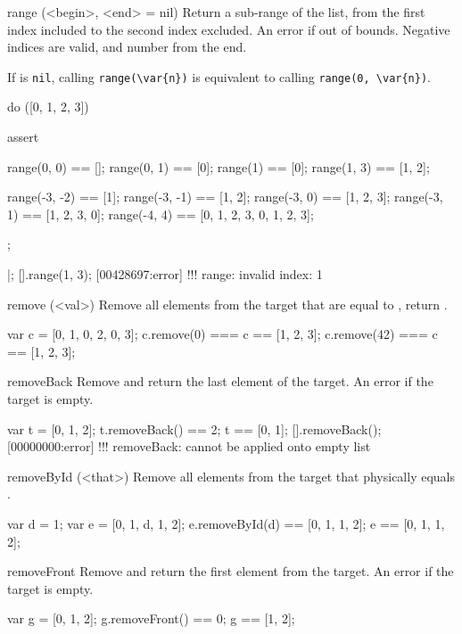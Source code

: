 \begin{urbiscriptapi}
\item[range](<begin>, <end> = nil)%
  Return a sub-range of the list, from the first index included to the
  second index excluded.  An error if out of bounds.  Negative indices
  are valid, and number from the end.

  If  is \lstinline|nil|, calling \lstinline|range(\var{n})|
  is equivalent to calling \lstinline|range(0, \var{n})|.

\begin{urbiscript}
do ([0, 1, 2, 3])
{
  assert
  {
    range(0, 0)   == [];
    range(0, 1)   == [0];
    range(1)      == [0];
    range(1, 3)   == [1, 2];

    range(-3, -2) == [1];
    range(-3, -1) == [1, 2];
    range(-3, 0)  == [1, 2, 3];
    range(-3, 1)  == [1, 2, 3, 0];
    range(-4, 4)  == [0, 1, 2, 3, 0, 1, 2, 3];
  };
}|;
[].range(1, 3);
[00428697:error] !!! range: invalid index: 1
\end{urbiscript}


\item[remove](<val>)%
  Remove all elements from the target that are equal to , return
  \this.

\begin{urbiassert}
var c = [0, 1, 0, 2, 0, 3];
c.remove(0)  === c ==  [1, 2, 3];
c.remove(42) === c ==  [1, 2, 3];
\end{urbiassert}


\item[removeBack]
  Remove and return the last element of the target. An error if the
  target is empty.

\begin{urbiassert}
var t = [0, 1, 2];
t.removeBack() == 2;
t == [0, 1];
[].removeBack();
[00000000:error] !!! removeBack: cannot be applied onto empty list
\end{urbiassert}


\item[removeById](<that>)%
  Remove all elements from the target that physically equals
  .

\begin{urbiassert}
var d = 1;
var e = [0, 1, d, 1, 2];
e.removeById(d) == [0, 1, 1, 2];
e == [0, 1, 1, 2];
\end{urbiassert}


\item[removeFront] Remove and return the first element from the target. An
  error if the target is empty.

\begin{urbiassert}
var g = [0, 1, 2];
g.removeFront() == 0;
g == [1, 2];


\end{urbiassert}
\end{urbiscriptapi}
